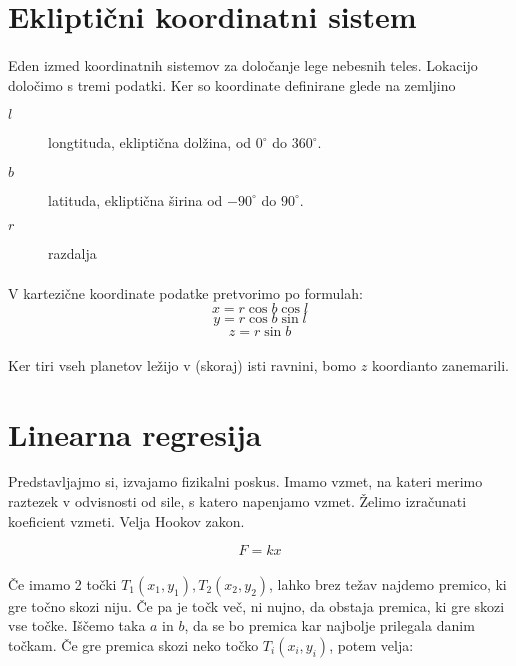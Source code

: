 \documentclass[a4paper, 12pt]{article}
\begin{document}
    \section*{Ekliptični koordinatni sistem}
    \paragraph{}
    Eden izmed koordinatnih sistemov za določanje lege nebesnih teles. Lokacijo določimo s tremi podatki. Ker so koordinate definirane glede na zemljino
    \begin{description}
        \item[$l$] longtituda, ekliptična dolžina, od $0^\circ$ do $360^\circ$.
        \item[$b$] latituda, ekliptična širina od $-90^\circ$ do $90^\circ$.
        \item[$r$] razdalja
    \end{description}

    \paragraph{}
    V kartezične koordinate podatke pretvorimo po formulah:
    $$x = r \cos b \cos l$$
    $$y = r \cos b \sin l$$
    $$z = r \sin b$$

    \paragraph{}
    Ker tiri vseh planetov ležijo v (skoraj) isti ravnini, bomo $z$ koordianto zanemarili.

	\section*{Linearna regresija}
	Predstavljajmo si, izvajamo fizikalni poskus. Imamo vzmet, na kateri merimo raztezek v odvisnosti od sile, s katero napenjamo vzmet. Želimo izračunati koeficient vzmeti. Velja Hookov zakon.

	$$F = k x$$

	\paragraph{}
	Če imamo 2 točki $T_1(x_1, y_1), T_2(x_2, y_2)$, lahko brez težav najdemo premico, ki gre točno skozi niju. Če pa je točk več, ni nujno, da obstaja premica, ki gre skozi vse točke.
	Iščemo taka $a$ in $b$, da se bo premica kar najbolje prilegala danim točkam. Če gre premica skozi neko točko $T_i(x_i, y_i)$, potem velja:
\end{document}
